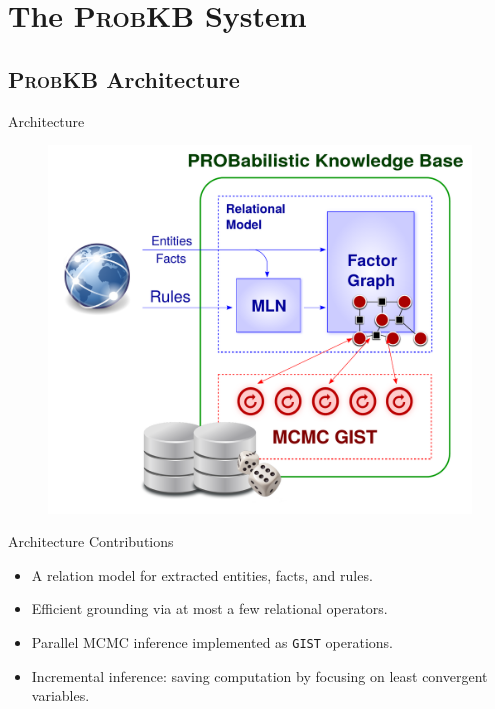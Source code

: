 \documentclass[onlymath,xcolor=pdftex,dvipsnames,table]{beamer}
\newcommand{\probkb}{\textsc{ProbKB}\xspace}
\newcommand{\stt}[1]{\texttt{\small #1}\xspace}
\newcommand{\head}[1]{{\large\color{OliveGreen}#1\\[2pt]}}
\begin{document}
\section{The \probkb System}
\subsection{\probkb Architecture}
\begin{frame}{Architecture}
\begin{figure}
  \centering
  \includegraphics[clip,trim=30 0 15 0,width=.7\textwidth]{probkbarch.pdf}
\end{figure}
\end{frame}

\begin{frame}{Architecture}
\head{Contributions}
\begin{itemize}
  \item A relation model for extracted entities, facts, and rules.
  \item Efficient grounding via at most a few relational operators.
  \item Parallel MCMC inference implemented as \stt{GIST} operations.
  \item Incremental inference: saving computation by focusing on least convergent variables.
\end{itemize}
\end{frame}

\end{document}

